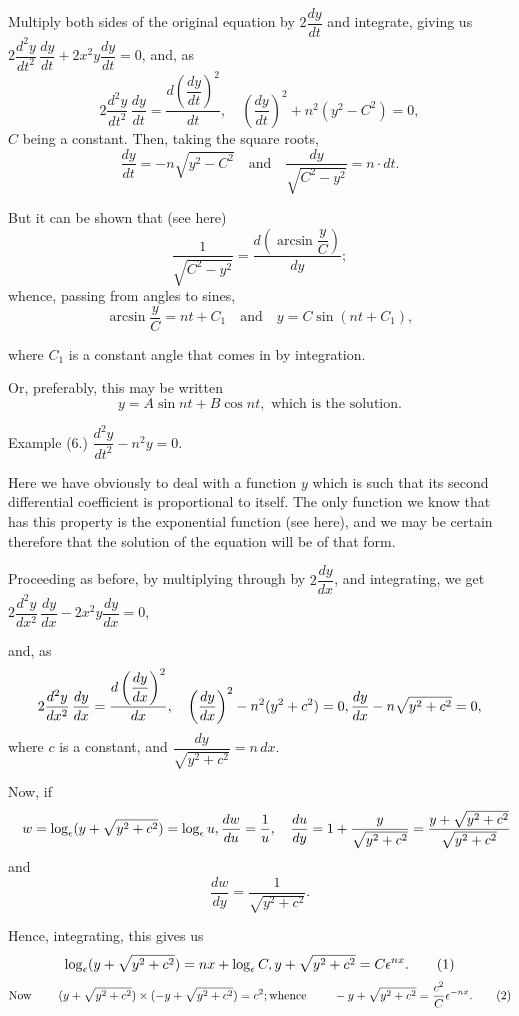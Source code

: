 \documentclass{ximera}
\begin{document}
Multiply both sides of the original equation by $2\dfrac{dy}{dt}$
and integrate, giving us $2\dfrac{d^2 y}{dt^2}\, \dfrac{dy}{dt} + 2x^2 y \dfrac{dy}{dt} = 0$, and, as
\[
2 \frac{d^2y}{dt^2}\, \frac{dy}{dt}
  = \frac{d \left(\dfrac{dy}{dt}\right)^2}{dt},\quad
\left(\frac{dy}{dt}\right)^2 + n^2 (y^2-C^2) = 0,
\]
$C$ being a constant. Then, taking the square roots,
\[
\frac{dy}{dt} = -n \sqrt{ y^2 - C^2}\quad \text{and}\quad
\frac{dy}{\sqrt{C^2 - y^2}} = n · dt.
\]

But it can be shown that (see here)
\[
\frac{1}{\sqrt{C^2 - y^2}} = \frac{d (\arcsin \dfrac{y}{C})}{dy};
\]
whence, passing from angles to sines,
\[
\arcsin \frac{y}{C} = nt + C_1\quad \text{and}\quad y = C \sin (nt + C_1),
\]

where $C_1$ is a constant angle that comes in by integration.

Or, preferably, this may be written
\[
y = A \sin nt + B \cos nt, \text{ which is the solution.}
\]


Example (6.) $\dfrac{d^2 y}{dt^2} - n^2 y = 0$.

Here we have obviously to deal with a function $y$
which is such that its second differential coefficient is
proportional to itself. The only function we know
that has this property is the exponential function
(see here), and we may be certain therefore that the
solution of the equation will be of that form.

Proceeding as before, by multiplying through by
$2 \dfrac{dy}{dx}$, and integrating, we get $2\dfrac{d^2 y}{dx^2}\, \dfrac{dy}{dx} - 2x^2 y \dfrac{dy}{dx}=0$,

 and, as
\[
2\frac{d^2 y}{dx^2}\, \frac{dy}{dx}
  = \frac{d \left(\dfrac{dy}{dx}\right)^2}{dx},\quad
\left(\frac{dy}{dx}\right)^2 - n^2 (y^2 + c^2) = 0, \\
\frac{dy}{dx} - n \sqrt{y^2 + c^2} = 0,
\]
where $c$ is a constant, and $\dfrac{dy}{\sqrt{y^2 + c^2}} = n\, dx$.

Now, if
\[
\quad w = \log_\epsilon ( y+ \sqrt{y^2+ c^2}) = \log_\epsilon u,\\
\frac{dw}{du} = \frac{1}{u},\quad \frac{du}{dy} = 1 + \frac{y}{\sqrt{y^2 + c^2}} = \frac{y + \sqrt{ y^2 + c^2}}{\sqrt{y^2 + c^2}} \\
\]
 and
\[
 \frac{dw}{dy} = \frac{1}{\sqrt{ y^2 + c^2}}.
\]

Hence, integrating, this gives us
\[
\log_\epsilon (y + \sqrt{y^2 + c^2} ) = nx + \log_\epsilon C, \\
y + \sqrt{y^2 + c^2} = C \epsilon^{nx}.
\tag*{(1)}  \\
\]
\[
   \text{Now}\;  \qquad ( y + \sqrt{y^2 + c^2} ) \times ( -y + \sqrt{y^2 + c^2} ) = c^2 ;    \\
  \text{whence}\;  \qquad  -y + \sqrt{y^2 + c^2} = \dfrac{c^2}{C} \epsilon^{-nx}.
\tag*{(2)}
\]
\end{document}
